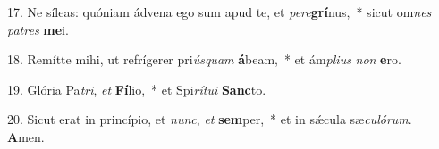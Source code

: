 17. Ne síleas: quóniam ádvena ego sum apud te, et \textit{per}\textit{e}\textbf{grí}nus,~*  sicut om\textit{nes} \textit{pa}\textit{tres} \textbf{me}i.\

18. Remítte mihi, ut refrígerer pri\textit{ús}\textit{quam} \textbf{á}beam,~*  et ám\textit{pli}\textit{us} \textit{non} \textbf{e}ro.\

19. Glória Pa\textit{tri}, \textit{et} \textbf{Fí}lio,~*  et Spi\textit{rí}\textit{tu}\textit{i} \textbf{Sanc}to.\

20. Sicut erat in princípio, et \textit{nunc}, \textit{et} \textbf{sem}per,~*  et in sǽcula sæ\textit{cu}\textit{ló}\textit{rum}. \textbf{A}men.\

